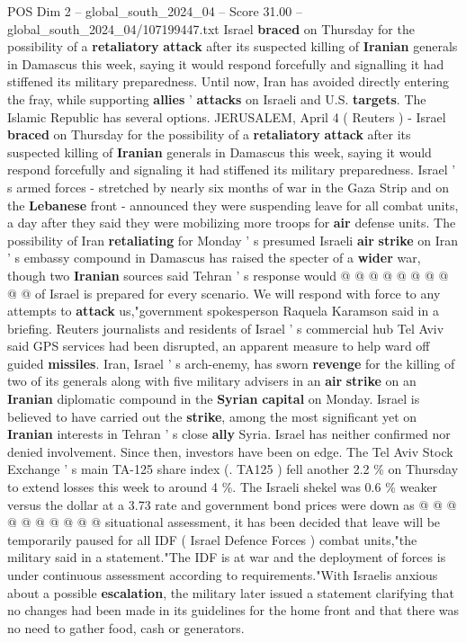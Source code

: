 \begin{textsample}{POS Dim 2 – global\_south\_2024\_04 – Score 31.00 – global\_south\_2024\_04/107199447.txt}  \label{ex:f2_pos_041}
Israel \textbf{braced} on Thursday for the possibility of a \textbf{retaliatory} \textbf{attack} after its suspected killing of \textbf{Iranian} generals in Damascus this week, saying it would respond forcefully and signalling it had stiffened its military preparedness.
Until now, Iran has avoided directly entering the fray, while supporting \textbf{allies} ' \textbf{attacks} on Israeli and U.S. \textbf{targets}.
The Islamic Republic has several options.
JERUSALEM, April 4 ( Reuters ) - Israel \textbf{braced} on Thursday for the possibility of a \textbf{retaliatory} \textbf{attack} after its suspected killing of \textbf{Iranian} generals in Damascus this week, saying it would respond forcefully and signaling it had stiffened its military preparedness.
Israel ' s armed forces - stretched by nearly six months of war in the Gaza Strip and on the \textbf{Lebanese} front - announced they were suspending leave for all combat units, a day after they said they were mobilizing more troops for \textbf{air} defense units.
The possibility of Iran \textbf{retaliating} for Monday ' s presumed Israeli \textbf{air} \textbf{strike} on Iran ' s embassy compound in Damascus has raised the specter of a \textbf{wider} war, though two \textbf{Iranian} sources said Tehran ' s response would @ @ @ @ @ @ @ @ @ @ of Israel is prepared for every scenario.
We will respond with force to any attempts to \textbf{attack} us,"government spokesperson Raquela Karamson said in a briefing.
Reuters journalists and residents of Israel ' s commercial hub Tel Aviv said GPS services had been disrupted, an apparent measure to help ward off guided \textbf{missiles}.
Iran, Israel ' s arch-enemy, has sworn \textbf{revenge} for the killing of two of its generals along with five military advisers in an \textbf{air} \textbf{strike} on an \textbf{Iranian} diplomatic compound in the \textbf{Syrian} \textbf{capital} on Monday.
Israel is believed to have carried out the \textbf{strike}, among the most significant yet on \textbf{Iranian} interests in Tehran ' s close \textbf{ally} Syria.
Israel has neither confirmed nor denied involvement.
Since then, investors have been on edge.
The Tel Aviv Stock Exchange ' s main TA-125 share index (.
TA125 ) fell another 2.2 \% on Thursday to extend losses this week to around 4 \%.
The Israeli shekel was 0.6 \% weaker versus the dollar at a 3.73 rate and government bond prices were down as @ @ @ @ @ @ @ @ @ @ situational assessment, it has been decided that leave will be temporarily paused for all IDF ( Israel Defence Forces ) combat units,"the military said in a statement."The IDF is at war and the deployment of forces is under continuous assessment according to requirements."With Israelis anxious about a possible \textbf{escalation}, the military later issued a statement clarifying that no changes had been made in its guidelines for the home front and that there was no need to gather food, cash or generators.

\end{textsample}
